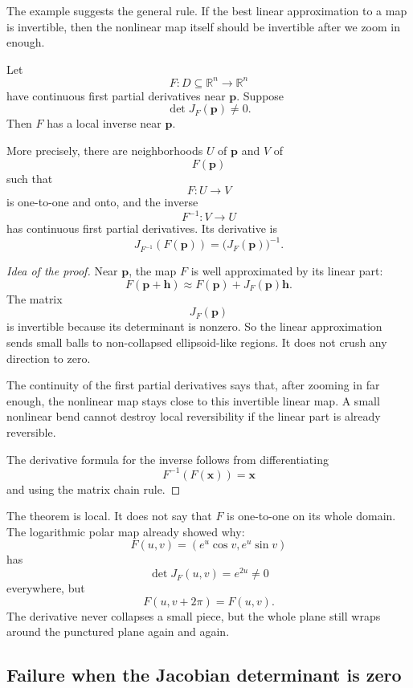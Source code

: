 The example suggests the general rule.  If the best linear approximation to a map is
invertible, then the nonlinear map itself should be invertible after we zoom in enough.

\begin{theorem}
Let
\[
    F:D\subseteq\mathbb R^n\to\mathbb R^n
\]
have continuous first partial derivatives near \(\mathbf p\).  Suppose
\[
    \det J_F(\mathbf p)\ne0.
\]
Then \(F\) has a local inverse near \(\mathbf p\).

More precisely, there are neighborhoods \(U\) of \(\mathbf p\) and \(V\) of
\[
    F(\mathbf p)
\]
such that
\[
    F:U\to V
\]
is one-to-one and onto, and the inverse
\[
    F^{-1}:V\to U
\]
has continuous first partial derivatives.  Its derivative is
\[
\boxed{
    J_{F^{-1}}(F(\mathbf p))
    =
    \bigl(J_F(\mathbf p)\bigr)^{-1}.
}
\]
\end{theorem}

\begin{proof}[Idea of the proof]
Near \(\mathbf p\), the map \(F\) is well approximated by its linear part:
\[
    F(\mathbf p+\mathbf h)
    \approx
    F(\mathbf p)+J_F(\mathbf p)\mathbf h.
\]
The matrix
\[
    J_F(\mathbf p)
\]
is invertible because its determinant is nonzero.  So the linear approximation sends
small balls to non-collapsed ellipsoid-like regions.  It does not crush any direction to
zero.

The continuity of the first partial derivatives says that, after zooming in far enough,
the nonlinear map stays close to this invertible linear map.  A small nonlinear bend
cannot destroy local reversibility if the linear part is already reversible.

The derivative formula for the inverse follows from differentiating
\[
    F^{-1}(F(\mathbf x))=\mathbf x
\]
and using the matrix chain rule.
\end{proof}

The theorem is local.  It does not say that \(F\) is one-to-one on its whole domain.
The logarithmic polar map already showed why:
\[
    F(u,v)=(e^u\cos v,e^u\sin v)
\]
has
\[
    \det J_F(u,v)=e^{2u}\ne0
\]
everywhere, but
\[
    F(u,v+2\pi)=F(u,v).
\]
The derivative never collapses a small piece, but the whole plane still wraps around
the punctured plane again and again.

\subsection{Failure when the Jacobian determinant is zero}

